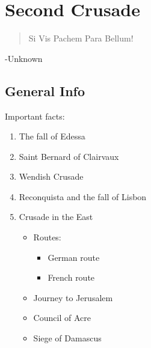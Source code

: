 \documentclass[11pt]{book}
\begin{document}
\chapter{Second Crusade}
\begin{quote}
Si Vis Pachem Para Bellum!
\end{quote}
-Unknown
\newpage
\section{General Info}
Important facts:
\begin{enumerate}
\item The fall of Edessa
\item  Saint Bernard of Clairvaux
\item Wendish Crusade
\item Reconquista and the fall of Lisbon
\item Crusade in the East \cite{CrusadeBook2}
\begin{itemize}
	\item Routes:
	\begin{itemize}
	\item German route
	\item French route
	\end{itemize}
	\item Journey to Jerusalem
	 \item  Council of Acre
	 \item Siege of Damascus
\end{itemize}
\end{enumerate}
\newpage
\end{document}
